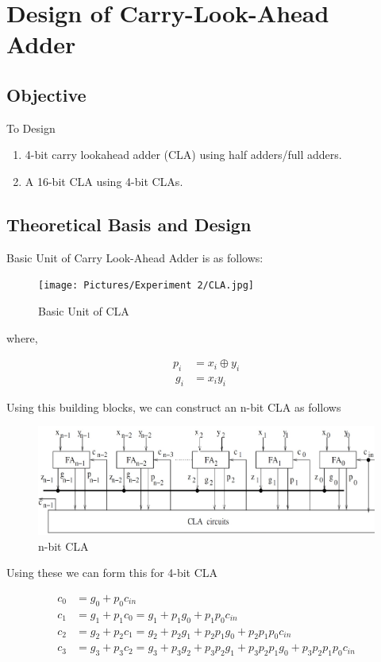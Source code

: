 \documentclass[a4paper]{article}
\begin{document}
\section{Design of Carry-Look-Ahead Adder}

\subsection{Objective}
To Design
\begin{enumerate}
    \item 4-bit carry lookahead adder (CLA) using half adders/full adders.
    \item A 16-bit CLA using 4-bit CLAs.
\end{enumerate}

\subsection{Theoretical Basis and Design}
Basic Unit of Carry Look-Ahead Adder is as follows:
\begin{figure}[h!]
    \centering
    \texttt{[image: Pictures/Experiment 2/CLA.jpg]}
    \caption{Basic Unit of CLA}
    \label{fig:CLA}
\end{figure}

where,

\begin{align}
    p_i & = x_i \oplus y_i \nonumber \\\
    g_i & = x_{i}y_i       \nonumber
\end{align}

Using this building blocks, we can construct an n-bit CLA as follows

\begin{figure}[h!]
    \centering
    \includegraphics[width=\linewidth]{Pictures/Experiment 2/nbitCLA.jpg}
    \caption{n-bit CLA}
    \label{fig:nbitCLA}
\end{figure}
\pagebreak

Using these we can form this for 4-bit CLA

\begin{align}
    c_0 & = g_0 + p_0c_{in} \nonumber                                                              \\
    c_1 & = g_1 + p_1c_0 = g_1 + p_1g_0 + p_1p_0c_{in} \nonumber                                   \\
    c_2 & = g_2 + p_2c_1 = g_2 + p_2g_1 + p_2p_1g_0 + p_2p_1p_0c_{in} \nonumber                    \\
    c_3 & = g_3 + p_3c_2 = g_3 + p_3g_2 + p_3p_2g_1 + p_3p_2p_1g_0 + p_3p_2p_1p_0c_{in} \nonumber 
\end{align}
\end{document}
